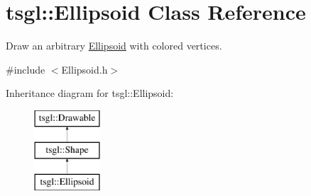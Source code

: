 \hypertarget{classtsgl_1_1_ellipsoid}{}\section{tsgl\+:\+:Ellipsoid Class Reference}
\label{classtsgl_1_1_ellipsoid}


Draw an arbitrary \hyperlink{classtsgl_1_1_ellipsoid}{Ellipsoid} with colored vertices.  




{\ttfamily \#include $<$Ellipsoid.\+h$>$}

Inheritance diagram for tsgl\+:\+:Ellipsoid\+:\begin{figure}[H]
\begin{center}
\leavevmode
\includegraphics[height=3.000000cm]{classtsgl_1_1_ellipsoid}
\end{center}
\end{figure}
